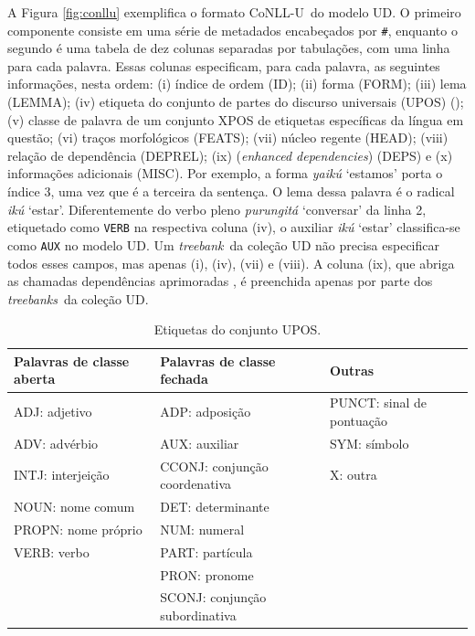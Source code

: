\documentclass[portuguese]{textolivre}
\newcommand{\wt}[2]{\textit{#1} `#2'}
\newcommand{\conll}{CoNLL-U}
\newcommand{\tbs}{\textit{treebanks}}
\newcommand{\tb}{\textit{treebank}}
\begin{document}
A Figura \ref{fig:conllu} exemplifica o formato \conll~do modelo UD. O primeiro componente consiste em uma série de metadados encabeçados por \texttt{\#}, enquanto o segundo é uma tabela de dez colunas separadas por tabulações, com uma linha para cada palavra. Essas colunas especificam, para cada palavra, as seguintes informações, nesta ordem: (i) índice de ordem (ID); (ii) forma (FORM); (iii) lema (LEMMA); (iv) etiqueta do conjunto de partes do discurso universais (UPOS) (); (v) classe de palavra de um conjunto XPOS de etiquetas específicas da língua em questão; (vi) traços morfológicos (FEATS); (vii) núcleo regente (HEAD); (viii) relação de dependência (DEPREL); (ix)  (\textit{enhanced dependencies}) (DEPS) e (x) informações adicionais (MISC). Por exemplo, a forma \wt{yaikú}{estamos} porta o índice 3, uma vez que é a terceira da sentença. O lema dessa palavra é o radical \wt{ikú}{estar}. Diferentemente do verbo pleno \wt{purungitá}{conversar} da linha 2, etiquetado como \texttt{VERB} na respectiva coluna (iv), o auxiliar \wt{ikú}{estar} classifica-se como \texttt{AUX} no modelo UD. Um \tb~da coleção UD não precisa especificar todos esses campos, mas apenas (i), (iv), (vii) e (viii). A coluna (ix), que abriga as chamadas dependências aprimoradas \parencite{schuster-manning-2016-enhanced-k}, é preenchida apenas por parte dos \tbs~da coleção UD.

\begin{table}[htbp]
\caption{Etiquetas do conjunto UPOS.}
\centering
\begin{tabular}{|l|l|l|}
\hline
\textbf{Palavras de classe aberta} & \textbf{Palavras de classe fechada} & \textbf{Outras} \\ \hline
ADJ: adjetivo & ADP: adposição & PUNCT: sinal de pontuação \\ \hline
ADV: advérbio & AUX: auxiliar & SYM: símbolo \\ \hline
INTJ: interjeição & CCONJ: conjunção coordenativa & X: outra \\ \hline
NOUN: nome comum & DET: determinante &  \\ \hline
PROPN: nome próprio & NUM: numeral &  \\ \hline
VERB: verbo & PART: partícula &  \\ \hline
 & PRON: pronome &  \\ \hline
 & SCONJ: conjunção subordinativa &  \\ \hline
\end{tabular}
\label{tab:upos}
\end{table}
\end{document}

